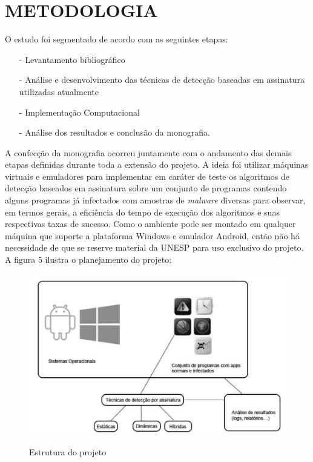 
\chapter{METODOLOGIA}
\label{c.metodologia}

O estudo foi segmentado de acordo com as seguintes etapas:

\begin{itemize}
	\item[-] Levantamento bibliográfico
	\item[-] Análise e desenvolvimento das técnicas de detecção baseadas em assinatura utilizadas atualmente
	\item[-] Implementação Computacional
	\item[-] Análise dos resultados e conclusão da monografia.
\end{itemize}
A confecção da monografia ocorreu juntamente com o andamento das demais
etapas definidas durante toda a extensão do projeto. A ideia foi utilizar
máquinas virtuais e emuladores para implementar em caráter de teste os
algoritmos de detecção baseados em assinatura sobre um conjunto de programas
contendo alguns programas já infectados com amostras de \textit{malware} diversas para
observar, em termos gerais, a eficiência do tempo de execução dos algoritmos e
suas respectivas taxas de sucesso. Como o ambiente pode ser montado em qualquer
máquina que suporte a plataforma Windows e emulador Android, então não há
necessidade de que se reserve material da UNESP para uso exclusivo do projeto.
A figura 5 ilustra o planejamento do projeto:
\begin{figure}[H]
\caption{\small Estrutura do projeto}
\centering
\includegraphics[scale=0.4]{figs/fig2}
\label{f.estrutura_projeto}
\end{figure}

